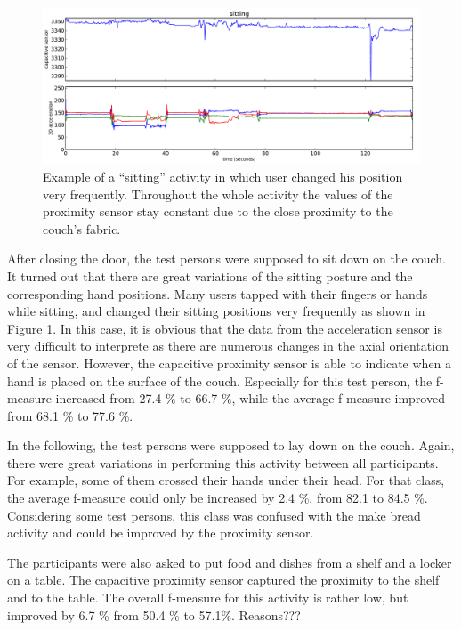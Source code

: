 \documentclass[runningheads,a4paper]{llncs}
\begin{document}
\begin{figure}[htbp]
	\centering
		\includegraphics[width=1.00\textwidth]{../Auswertung/images/eugen_2.pdf}
	\caption{Example of a ``sitting'' activity in which user changed his position very frequently. Throughout the whole activity the values of the proximity sensor stay constant due to the close proximity to the couch's fabric.}
	\label{fig:eugen_2}
\end{figure}

After closing the door, the test persons were supposed to sit down on the couch. It turned out that there are great variations of the sitting posture and the corresponding hand positions. Many users tapped with their fingers or hands while sitting, and changed their sitting positions very frequently as shown in Figure \ref{fig:eugen_2}. In this case, it is obvious that the data from the acceleration sensor is very difficult to interprete as there are numerous changes in the axial orientation of the sensor. However, the capacitive proximity sensor is able to indicate when a hand is placed on the surface of the couch. Especially for this test person, the f-measure increased from 27.4 \% to 66.7 \%, while the average f-measure improved from 68.1 \% to 77.6 \%. 

In the following, the test persons were supposed to lay down on the couch. Again, there were great variations in performing this activity between all participants. For example, some of them crossed their hands under their head. For that class, the average f-measure could only be increased by 2.4 \%, from 82.1 to 84.5 \%. Considering some test persons, this class was confused with the make bread activity and could be improved by the proximity sensor. 

The participants were also asked to put food and dishes from a shelf and a locker on a table. The capacitive proximity sensor captured the proximity to the shelf and to the table. The overall f-measure for this activity is rather low, but improved by 6.7 \% from 50.4 \% to 57.1\%. Reasons???
\end{document}
